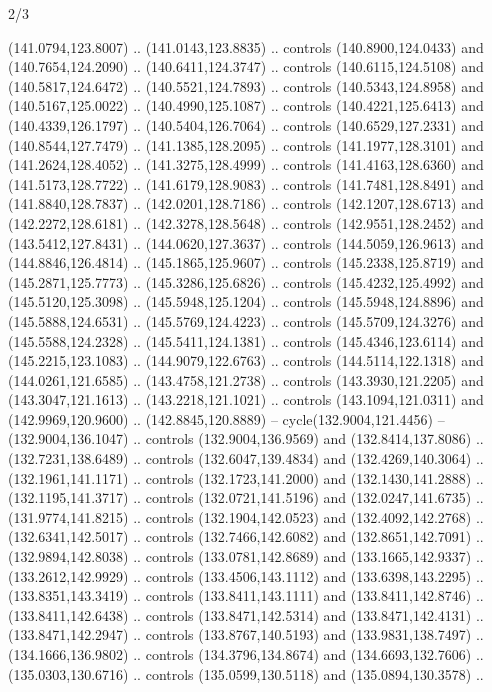 \begin{flagdescription}{2/3}
\begin{scope}[shift={(0.5\flaglength,0.5)},scale=\flagwidth/320]
\begin{scope}[y=0.8pt, x=0.8pt, yscale=-1,shift={(-118.3,-146)}]
  (141.0794,123.8007) .. (141.0143,123.8835) .. controls (140.8900,124.0433) and
  (140.7654,124.2090) .. (140.6411,124.3747) .. controls (140.6115,124.5108) and
  (140.5817,124.6472) .. (140.5521,124.7893) .. controls (140.5343,124.8958) and
  (140.5167,125.0022) .. (140.4990,125.1087) .. controls (140.4221,125.6413) and
  (140.4339,126.1797) .. (140.5404,126.7064) .. controls (140.6529,127.2331) and
  (140.8544,127.7479) .. (141.1385,128.2095) .. controls (141.1977,128.3101) and
  (141.2624,128.4052) .. (141.3275,128.4999) .. controls (141.4163,128.6360) and
  (141.5173,128.7722) .. (141.6179,128.9083) .. controls (141.7481,128.8491) and
  (141.8840,128.7837) .. (142.0201,128.7186) .. controls (142.1207,128.6713) and
  (142.2272,128.6181) .. (142.3278,128.5648) .. controls (142.9551,128.2452) and
  (143.5412,127.8431) .. (144.0620,127.3637) .. controls (144.5059,126.9613) and
  (144.8846,126.4814) .. (145.1865,125.9607) .. controls (145.2338,125.8719) and
  (145.2871,125.7773) .. (145.3286,125.6826) .. controls (145.4232,125.4992) and
  (145.5120,125.3098) .. (145.5948,125.1204) .. controls (145.5948,124.8896) and
  (145.5888,124.6531) .. (145.5769,124.4223) .. controls (145.5709,124.3276) and
  (145.5588,124.2328) .. (145.5411,124.1381) .. controls (145.4346,123.6114) and
  (145.2215,123.1083) .. (144.9079,122.6763) .. controls (144.5114,122.1318) and
  (144.0261,121.6585) .. (143.4758,121.2738) .. controls (143.3930,121.2205) and
  (143.3047,121.1613) .. (143.2218,121.1021) .. controls (143.1094,121.0311) and
  (142.9969,120.9600) .. (142.8845,120.8889) -- cycle(132.9004,121.4456) --
  (132.9004,136.1047) .. controls (132.9004,136.9569) and (132.8414,137.8086) ..
  (132.7231,138.6489) .. controls (132.6047,139.4834) and (132.4269,140.3064) ..
  (132.1961,141.1171) .. controls (132.1723,141.2000) and (132.1430,141.2888) ..
  (132.1195,141.3717) .. controls (132.0721,141.5196) and (132.0247,141.6735) ..
  (131.9774,141.8215) .. controls (132.1904,142.0523) and (132.4092,142.2768) ..
  (132.6341,142.5017) .. controls (132.7466,142.6082) and (132.8651,142.7091) ..
  (132.9894,142.8038) .. controls (133.0781,142.8689) and (133.1665,142.9337) ..
  (133.2612,142.9929) .. controls (133.4506,143.1112) and (133.6398,143.2295) ..
  (133.8351,143.3419) .. controls (133.8411,143.1111) and (133.8411,142.8746) ..
  (133.8411,142.6438) .. controls (133.8471,142.5314) and (133.8471,142.4131) ..
  (133.8471,142.2947) .. controls (133.8767,140.5193) and (133.9831,138.7497) ..
  (134.1666,136.9802) .. controls (134.3796,134.8674) and (134.6693,132.7606) ..
  (135.0303,130.6716) .. controls (135.0599,130.5118) and (135.0894,130.3578) ..

\end{scope}
\end{scope}
\end{flagdescription}
